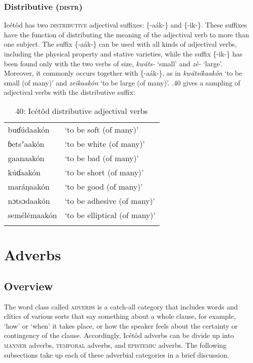 \begin{table}
\subsubsection{Distributive (\textsc{distr})}

Icétôd has two \textsc{distributive }adjectival suffixes: \{-aák-\} and \{-ìk-\}. These suffixes have the function of distributing the meaning of the adjectival verb to more than one subject. The suffix \{-aák-\} can be used with all kinds of adjectival verbs, including the physical property and stative varieties, while the suffix \{-ìk-\} has been found only with the two verbs of size, \textit{kwáts- }‘small’ and \textit{zè- }‘large’. Moreover, it commonly occurs together with \{-aák-\}, as in \textit{kwátsíkaakón }‘to be small (of many)’ and \textit{zeikaakón }‘to be large (of many)’. .40 gives a sampling of adjectival verbs with the distributive suffix:


\begin{table}
\caption{40: Icétôd distributive adjectival verbs}
\label{tab:8}


\begin{tabularx}{\textwidth}{XX}
\lsptoprule

buɗúdaakón & ‘to be soft (of many)’\\
ɓetsʼaakón & ‘to be white (of many)’\\
gaanaakón & ‘to be bad (of many)’\\
kúɗaakón & ‘to be short (of many)’\\
maráŋaakón & ‘to be good (of many)’\\
nɔtsɔdaakón & ‘to be adhesive (of many)’\\
semélémaakón & ‘to be elliptical (of many)’\\
\lspbottomrule
\end{tabularx}
\end{table}

\section{Adverbs}



\subsection{Overview}


The word class called \textsc{adverbs} is a catch-all category that includes words and clitics of various sorts that say something about a whole clause, for example, ‘how’ or ‘when’ it takes place, or how the speaker feels about the certainty or contingency of the clause. Accordingly, Icétôd adverbs can be divide up into \textsc{manner} adverbs, \textsc{temporal} adverbs, and \textsc{epistemic} adverbs. The following subsections take up each of these adverbial categories in a brief discussion.





\end{table}
